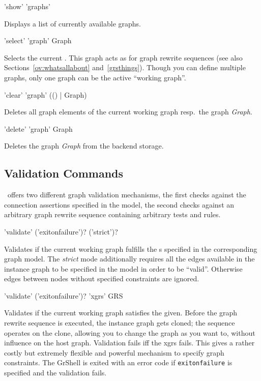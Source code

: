 \begin{rail}
  'show' 'graphs'
\end{rail}
Displays a list of currently available graphs.

\begin{rail}
  'select' 'graph' Graph
\end{rail}
Selects the current .
This graph acts as \emph{} for graph rewrite sequences (see also Sections~\ref{ov:whatsallabout} and~\ref{grsthings}).
Though you can define multiple graphs, only one graph can be the active ``working graph''.

\begin{rail}
  'clear' 'graph' (() | Graph)
\end{rail}
Deletes all graph elements of the current working graph resp.\ the graph \emph{Graph}.

\begin{rail}
  'delete' 'graph' Graph
\end{rail}
Deletes the graph \emph{Graph} from the backend storage.


\subsection{Validation Commands}

\GrG\ offers two different graph validation mechanisms, the first checks against the connection assertions specified in the model, the second checks against an arbitrary graph rewrite sequence containing arbitrary tests and rules.

\begin{rail}
  'validate' ('exitonfailure')? ('strict')?
\end{rail}
Validates if the current working graph fulfills the s specified in the corresponding graph model.
The \emph{strict} mode additionally requires all the edges available in the instance graph to be specified in the model in order to be ``valid''.
Otherwise edges between nodes without specified constraints are ignored.

\begin{rail}
  'validate' ('exitonfailure')? 'xgrs' GRS
\end{rail}
Validates if the current working graph satisfies the  given.
Before the graph rewrite sequence is executed, the instance graph gets cloned;
the sequence operates on the clone, allowing you to change the graph as you want to, without influence on the host graph.
Validation fails iff the xgrs fails.
This gives a rather costly but extremely flexible and powerful mechanism to specify graph constraints.
The GrShell is exited with an error code if \texttt{exitonfailure} is specified and the validation fails.

